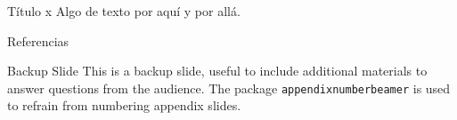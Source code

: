 \documentclass{beamer}
\begin{document}
\begin{frame}{Título x}
	Algo de texto por aquí y por allá.
\end{frame}


\appendix

\begin{frame}{Referencias}
	
	
\end{frame}


\begin{frame}{Backup Slide}
	This is a backup slide, useful to include additional materials to answer questions from the audience.
	\vfill
	The package \texttt{appendixnumberbeamer} is used to refrain from numbering appendix slides.
\end{frame}

\end{document}
